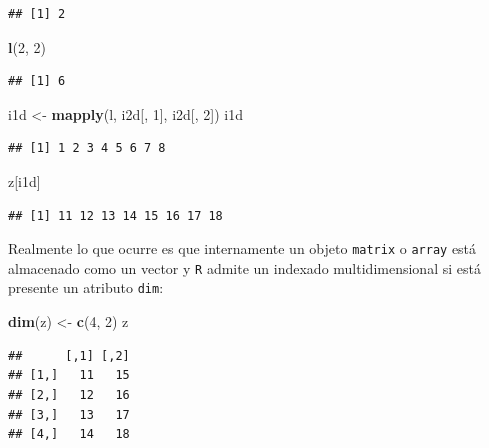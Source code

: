 \documentclass[
]{book}
\newenvironment{Shaded}{\begin{snugshade}}{\end{snugshade}}
\newcommand{\DecValTok}[1]{\textcolor[rgb]{0.00,0.00,0.81}{#1}}
\newcommand{\KeywordTok}[1]{\textcolor[rgb]{0.13,0.29,0.53}{\textbf{#1}}}
\newcommand{\NormalTok}[1]{#1}
\newcommand{\StringTok}[1]{\textcolor[rgb]{0.31,0.60,0.02}{#1}}
\theoremstyle{break}
\theoremstyle{definition}
\theoremstyle{definition}
\theoremstyle{definition}
\theoremstyle{remark}
\begin{document}
\begin{verbatim}
## [1] 2
\end{verbatim}

\begin{Shaded}
\begin{Highlighting}[]
\KeywordTok{l}\NormalTok{(}\DecValTok{2}\NormalTok{, }\DecValTok{2}\NormalTok{)}
\end{Highlighting}
\end{Shaded}

\begin{verbatim}
## [1] 6
\end{verbatim}

\begin{Shaded}
\begin{Highlighting}[]
\NormalTok{i1d <-}\StringTok{ }\KeywordTok{mapply}\NormalTok{(l, i2d[, }\DecValTok{1}\NormalTok{], i2d[, }\DecValTok{2}\NormalTok{])}
\NormalTok{i1d}
\end{Highlighting}
\end{Shaded}

\begin{verbatim}
## [1] 1 2 3 4 5 6 7 8
\end{verbatim}

\begin{Shaded}
\begin{Highlighting}[]
\NormalTok{z[i1d]}
\end{Highlighting}
\end{Shaded}

\begin{verbatim}
## [1] 11 12 13 14 15 16 17 18
\end{verbatim}

Realmente lo que ocurre es que internamente un objeto \texttt{matrix} o \texttt{array} está almacenado como un vector y \texttt{R} admite un indexado multidimensional si está presente un atributo \texttt{dim}:

\begin{Shaded}
\begin{Highlighting}[]
\KeywordTok{dim}\NormalTok{(z) <-}\StringTok{ }\KeywordTok{c}\NormalTok{(}\DecValTok{4}\NormalTok{, }\DecValTok{2}\NormalTok{)}
\NormalTok{z}
\end{Highlighting}
\end{Shaded}

\begin{verbatim}
##      [,1] [,2]
## [1,]   11   15
## [2,]   12   16
## [3,]   13   17
## [4,]   14   18
\end{verbatim}
\end{document}
